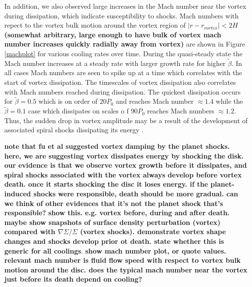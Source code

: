 In addition, we also observed large increases in the Mach number near
the vortex during dissipation, which indicate susceptibility to
shocks. Mach numbers with repect to the vortex bulk motion around the vortex
 region of $|r-r_{vortex}|<2H$ {\bf (somewhat arbitrary, large enough to have bulk of vortex mach number increases quickly radially away from vortex)}
are shown in Figure \ref{machplot} for various cooling rates over time.
During the quasi-steady state the Mach number increases at a
steady rate with larger growth rate for higher $\tilde\beta$.
In all cases Mach numbers are seen to spike up at a time which correlates with
the start of vortex dissipation.
The timescales of vortex dissipation also correlates with 
Mach numbers reached during dissipation. The quickest dissipation occurs for 
$\tilde\beta=0.5$ which is on order of $20P_0$ and reaches Mach number
 $\approx1.4$ while the $\tilde\beta=0.1$ case which dissipates on scales o
f $90P_0$ reaches Mach numbers $\approx1.2$.
Thus, the sudden drop in vortex amplitude may  
be a result of the development of associated spiral shocks dissipating
its energy \citep[cf.][who 
  suggested damping due to planet-induced shocks]{fu14}.  

{\bf note that fu et al suggested vortex damping by the planet
  shocks. here, we are suggesting vortex dissipates energy by shocking
  the disk. our evidence is that we observe vortex growth before it
  dissipates, and spiral shocks associated with the vortex always
  develop before vortex death. once it starts shocking the disc it
  loses energy. if the planet-induced shocks were responsible, death
  should be more gradual. can we think of other evidences that it's
  not the planet shock that's responsible?}
{\bf show
  this. e.g. vortex before, during and after death. maybe show
  snapshots of surface density perturbation (vortex) compared with
  $\nabla\Sigma/\Sigma$ (vortex shocks). demonstrate vortex shape
  changes and shocks develop prior ot death. state whether this is
  generic for all coolings}. 
{\bf show mach number plot, or quote values. relevant mach
  number is fluid flow speed with respect to 
  vortex bulk motion around the disc. does the typical mach number
  near the vortex just before its death depend on cooling?} 


